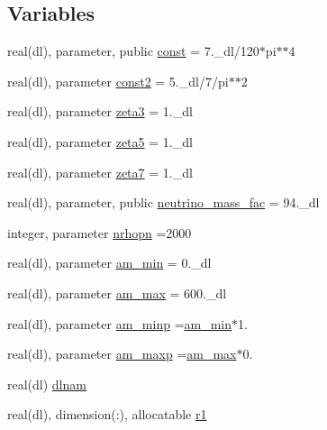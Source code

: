 \subsection*{Variables}
\begin{DoxyCompactItemize}
\item 
real(dl), parameter, public \mbox{\hyperlink{namespacemassivenu_a70abc43ce18c77a19a2a5a3577cdca33}{const}} = 7.\+\_\+dl/120$\ast$pi$\ast$$\ast$4
\item 
real(dl), parameter \mbox{\hyperlink{namespacemassivenu_a63b8c9d69523c7f853ffbcc4d48fda0e}{const2}} = 5.\+\_\+dl/7/pi$\ast$$\ast$2
\item 
real(dl), parameter \mbox{\hyperlink{namespacemassivenu_a51e0c61eba59c96a5b43e2d0c8eacd6f}{zeta3}} = 1.\+\_\+dl
\item 
real(dl), parameter \mbox{\hyperlink{namespacemassivenu_aee270302c33f3b6976ed226a553b26cf}{zeta5}} = 1.\+\_\+dl
\item 
real(dl), parameter \mbox{\hyperlink{namespacemassivenu_a7d96619046ccc740edb22a9588426c34}{zeta7}} = 1.\+\_\+dl
\item 
real(dl), parameter, public \mbox{\hyperlink{namespacemassivenu_a12e889efae466257e45a8341a9f6150e}{neutrino\+\_\+mass\+\_\+fac}} = 94.\+\_\+dl
\item 
integer, parameter \mbox{\hyperlink{namespacemassivenu_a25f2b3dce3fcea3371981c04a2ebd80c}{nrhopn}} =2000
\item 
real(dl), parameter \mbox{\hyperlink{namespacemassivenu_a78f8e34c3e80b51195c21fdaa07761b1}{am\+\_\+min}} = 0.\+\_\+dl
\item 
real(dl), parameter \mbox{\hyperlink{namespacemassivenu_a41419034ccb5dbf62c14483531ca5fb1}{am\+\_\+max}} = 600.\+\_\+dl
\item 
real(dl), parameter \mbox{\hyperlink{namespacemassivenu_a3d0cea67f62f7fd30ce0c991b6215a9b}{am\+\_\+minp}} =\mbox{\hyperlink{namespacemassivenu_a78f8e34c3e80b51195c21fdaa07761b1}{am\+\_\+min}}$\ast$1.
\item 
real(dl), parameter \mbox{\hyperlink{namespacemassivenu_a70711a9642331142a38cd93e15ae874a}{am\+\_\+maxp}} =\mbox{\hyperlink{namespacemassivenu_a41419034ccb5dbf62c14483531ca5fb1}{am\+\_\+max}}$\ast$0.
\item 
real(dl) \mbox{\hyperlink{namespacemassivenu_a0bc7918cccdf1d31a74fd0b7c68f6249}{dlnam}}
\item 
real(dl), dimension(\+:), allocatable \mbox{\hyperlink{namespacemassivenu_a17286610cbb3be4f5e2e6cb9207cd3d3}{r1}}

\end{DoxyCompactItemize}
